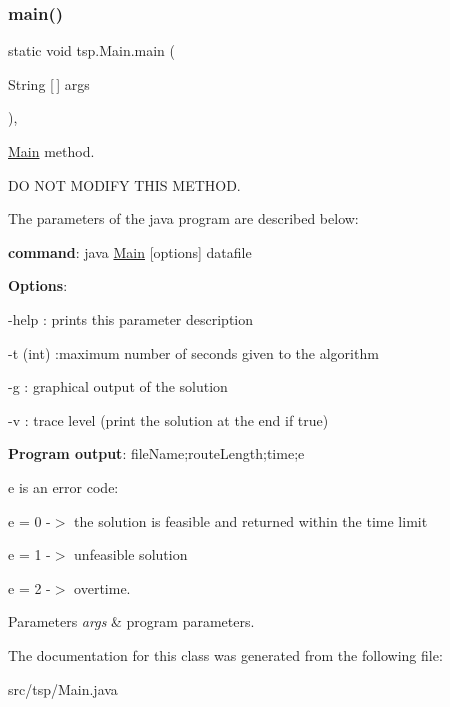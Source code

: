 \subsubsection{\texorpdfstring{main()}{main()}}
{\footnotesize\ttfamily static void tsp.\+Main.\+main (\begin{DoxyParamCaption}\item[{String \mbox{[}$\,$\mbox{]}}]{args }\end{DoxyParamCaption})\hspace{0.3cm}{\ttfamily [inline]}, {\ttfamily [static]}}

\mbox{\hyperlink{classtsp_1_1_main}{Main}} method.

DO N\+OT M\+O\+D\+I\+FY T\+H\+IS M\+E\+T\+H\+OD.

The parameters of the java program are described below\+:

{\bfseries command}\+: java \mbox{\hyperlink{classtsp_1_1_main}{Main}} \mbox{[}options\mbox{]} datafile

{\bfseries Options}\+:
\begin{DoxyItemize}
\item -\/help \+: prints this parameter description
\item -\/t (int) \+:maximum number of seconds given to the algorithm
\item -\/g \+: graphical output of the solution
\item -\/v \+: trace level (print the solution at the end if true)
\end{DoxyItemize}

{\bfseries Program output}\+: file\+Name;route\+Length;time;e

e is an error code\+:
\begin{DoxyItemize}
\item e = 0 -\/$>$ the solution is feasible and returned within the time limit
\item e = 1 -\/$>$ unfeasible solution
\item e = 2 -\/$>$ overtime.
\end{DoxyItemize}


\begin{DoxyParams}{Parameters}
{\em args} & program parameters. \\
\hline
\end{DoxyParams}


The documentation for this class was generated from the following file\+:\begin{DoxyCompactItemize}
\item 
src/tsp/Main.\+java\end{DoxyCompactItemize}

